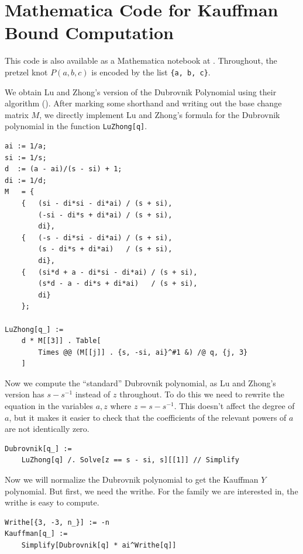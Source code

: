 \chapter{Mathematica Code for Kauffman Bound Computation}\label{ch:appendix}

\lstset{language=Mathematica,style=better}

This code is also available as a Mathematica notebook at \cite{my-code}.
Throughout, the pretzel knot $P(a, b, c)$ is encoded by the list \lstinline|{a, b, c}|.

We obtain Lu and Zhong's version of the Dubrovnik Polynomial using their algorithm (\cite{lu-zhong}).
After marking some shorthand and writing out the base change matrix $M$, we directly implement Lu and Zhong's formula for the Dubrovnik polynomial in the function \lstinline|LuZhong[q]|.

\begin{lstlisting}
ai := 1/a;
si := 1/s;
d  := (a - ai)/(s - si) + 1;
di := 1/d;
M   = {
    {   (si - di*si - di*ai) / (s + si),
        (-si - di*s + di*ai) / (s + si),
        di},
    {   (-s - di*si - di*ai) / (s + si),
        (s - di*s + di*ai)   / (s + si),
        di},
    {   (si*d + a - di*si - di*ai) / (s + si),
        (s*d - a - di*s + di*ai)   / (s + si),
        di}
    };

LuZhong[q_] :=
    d * M[[3]] . Table[
        Times @@ (M[[j]] . {s, -si, ai}^#1 &) /@ q, {j, 3}
    ]
\end{lstlisting}

Now we compute the ``standard'' Dubrovnik polynomial, as Lu and Zhong's version has $s - s^{-1}$ instead of $z$ throughout. To do this we need to rewrite the equation in the variables $a, z$ where $z = s - s^{-1}$. This doesn't affect the degree of $a$, but it makes it easier to check that the coefficients of the relevant powers of $a$ are not identically zero.

\begin{lstlisting}
Dubrovnik[q_] :=
 	LuZhong[q] /. Solve[z == s - si, s][[1]] // Simplify
\end{lstlisting}

Now we will normalize the Dubrovnik polynomial to get the Kauffman $Y$ polynomial. But first, we need the writhe. For the family we are interested in, the writhe is easy to compute.

\begin{lstlisting}
Writhe[{3, -3, n_}] := -n
Kauffman[q_] :=
    Simplify[Dubrovnik[q] * ai^Writhe[q]]
\end{lstlisting}

